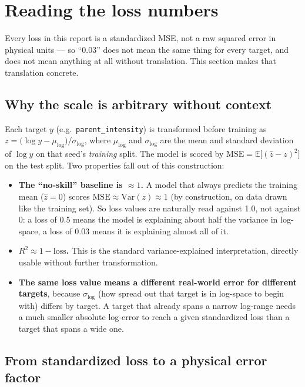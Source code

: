 \documentclass[11pt]{article}
\begin{document}
\section{Reading the loss numbers}
\label{sec:units}

Every loss in this report is a standardized MSE, not a raw squared error in
physical units --- so ``0.03'' does not mean the same thing for every target, and
does not mean anything at all without translation. This section makes that
translation concrete.

\subsection{Why the scale is arbitrary without context}

Each target $y$ (e.g.\ \texttt{parent\_intensity}) is transformed before training
as $z = \bigl(\log y - \mu_{\log}\bigr)/\sigma_{\log}$, where $\mu_{\log}$ and
$\sigma_{\log}$ are the mean and standard deviation of $\log y$ on that seed's
\emph{training} split. The model is scored by $\mathrm{MSE} =
\mathbb{E}\bigl[(\hat z - z)^2\bigr]$ on the test split. Two properties fall out of
this construction:

\begin{itemize}
  \item \textbf{The ``no-skill'' baseline is $\approx 1$.} A model that always
    predicts the training mean ($\hat z = 0$) scores $\mathrm{MSE} \approx
    \mathrm{Var}(z) \approx 1$ (by construction, on data drawn like the training
    set). So loss values are naturally read against 1.0, not against 0: a loss of
    0.5 means the model is explaining about half the variance in log-space, a loss
    of 0.03 means it is explaining almost all of it.
  \item \textbf{$R^2 \approx 1 - \mathrm{loss}$.} This is the standard
    variance-explained interpretation, directly usable without further
    transformation.
  \item \textbf{The same loss value means a different real-world error for
    different targets}, because $\sigma_{\log}$ (how spread out that target is in
    log-space to begin with) differs by target. A target that already spans a
    narrow log-range needs a much smaller absolute log-error to reach a given
    standardized loss than a target that spans a wide one.
\end{itemize}

\subsection{From standardized loss to a physical error factor}
\end{document}
